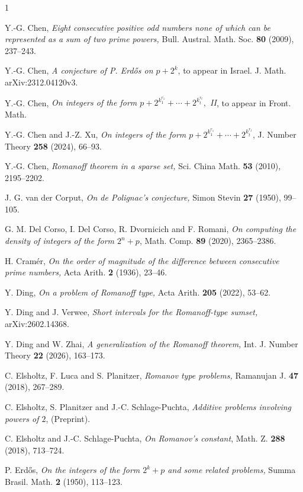 \documentclass[12pt,a4paper,reqno]{amsart}
\numberwithin{equation}{section}
\theoremstyle{plain}
\theoremstyle{definition}
\begin{document}
\begin{thebibliography}{1}

Y.-G. Chen, {\it Eight consecutive positive odd numbers none of which can be represented as a
sum of two prime powers,} Bull. Austral. Math. Soc. {\bf80} (2009), 237--243.

Y.-G. Chen, {\it A conjecture of P. Erd\H os on $p+2^k$}, to appear in Israel. J. Math. arXiv:2312.04120v3.

Y.-G. Chen, {\it On integers of the form $p+2^{k_1^{r_1}}+\cdots+2^{k_t^{r_t}},$ II}, to appear in Front. Math. 

Y.-G. Chen and J.-Z. Xu, {\it On integers of the form $p+2^{k_1^{r_1}}+\cdots+2^{k_t^{r_t}}$}, J. Number Theory {\bf 258} (2024), 66--93. 

Y.-G. Chen, {\it Romanoff theorem in a sparse set,} Sci. China Math. {\bf53} (2010), 2195--2202.

J. G. van der Corput, {\it On de Polignac's conjecture,} Simon Stevin {\bf 27} (1950), 99--105.

G. M. Del Corso, I. Del Corso, R. Dvornicich and F. Romani, {\it On computing the density of integers of the form $2^n+p$}, Math. Comp. {\bf 89} (2020), 2365--2386.

H. Cram\'er, {\it On the order of magnitude of the difference between consecutive prime numbers,} Acta Arith. {\bf 2} (1936), 23--46.

Y. Ding, {\it On a problem of Romanoff type,} Acta Arith. {\bf 205} (2022), 53--62.

Y. Ding and J. Verwee, {\it Short intervals for the Romanoff-type sumset,} arXiv:2602.14368.

Y. Ding and W. Zhai, {\it A generalization of the Romanoff theorem,} Int. J. Number Theory {\bf 22} (2026), 163--173.

C. Elsholtz, F. Luca and S. Planitzer, {\it Romanov type problems,} Ramanujan J. {\bf47} (2018), 267--289.

C. Elsholtz, S. Planitzer and J.-C. Schlage-Puchta, {\it Additive problems involving powers of $2$}, (Preprint).

C. Elsholtz and J.-C. Schlage-Puchta, {\it On Romanov's constant}, Math. Z. {\bf288} (2018), 
713--724.

P. Erd\H os, {\it On the integers of the form $2^k+p$ and some related problems,} Summa Brasil. Math. {\bf 2} (1950), 113--123.


\end{thebibliography}
\end{document}
